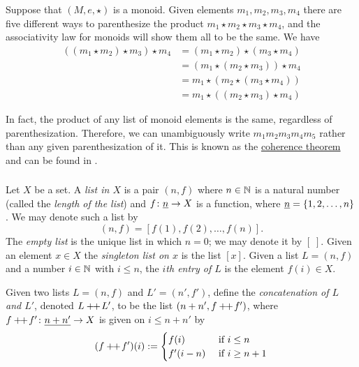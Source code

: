 \begin{exampleRUS}\label{ex:trivial monoid}
\end{exampleRUS}

\begin{exampleENG}
Suppose that $(M,e,\star)$ is a monoid. Given elements $m_1,m_2,m_3,m_4$ there are five different ways to parenthesize the product $m_1\star m_2\star m_3\star m_4$, and the associativity law for monoids will show them all to be the same. We have
\begin{align*}
((m_1\star m_2)\star m_3)\star m_4&=(m_1\star m_2)\star (m_3\star m_4)\\
&=(m_1\star(m_2\star m_3))\star m_4\\
&=m_1\star(m_2\star (m_3\star m_4))\\
&=m_1\star((m_2\star m_3)\star m_4)
\end{align*}

In fact, the product of any list of monoid elements is the same, regardless of parenthesization. Therefore, we can unambiguously write $m_1m_2m_3m_4m_5$ rather than any given parenthesization of it. This is known as the \href{http://en.wikipedia.org/wiki/Coherence_theorem}{\text coherence theorem} and can be found in \cite{Mac}.
\end{exampleENG}

\begin{exampleRUS}
\end{exampleRUS}


\subsubsection{}\label{sec:free monoid}

\begin{definitionENG}\label{def:list}
Let $X$ be a set. A {\em list in $X$} is a pair $(n,f)$ where $n\in{\mathbb N}$ is a natural number (called the {\em length of the list}) and $f\colon\underline{n}\rightarrow X$ is a function, where $\underline{n}=\{1,2,\ldots,n\}$. We may denote such a list by 
$$(n,f)=[f(1),f(2),\ldots,f(n)].$$ 
The {\em empty list} is the unique list in which $n=0$; we may denote it by $[\;]$. Given an element $x\in X$ the {\em singleton list on $x$} is the list $[x]$. Given a list $L=(n,f)$ and a number $i\in{\mathbb N}$ with $i\leq n$, the {\em $i$th entry of $L$} is the element $f(i)\in X$. 

Given two lists $L=(n,f)$ and $L'=(n',f')$, define the {\em concatenation of $L$ and $L'$}, denoted $L+\!\!+\hspace{1pt} L'$, to be the list $(n+n',f+\!\!+\hspace{1pt} f')$, where $f+\!\!+\hspace{1pt} f'\colon \underline{n+n'}\rightarrow X$ is given on $i\leq n+n'$ by
$$(f+\!\!+\hspace{1pt} f')(i):=
\begin{cases}
f(i)&\textnormal{ if }i\leq n\\
f'(i-n)&\textnormal{ if }i\geq n+1
\end{cases}
$$
\end{definitionENG}

